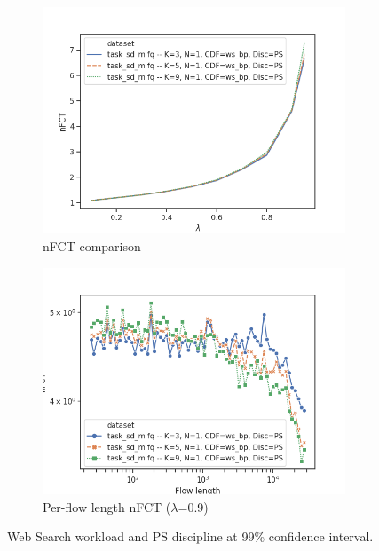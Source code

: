 \begin{figure}
	\centering
	\begin{subfigure}{.5\textwidth}
		\centering
		\includegraphics[width=0.99\textwidth]{Chapter3/Figures/lb_opt_vs_nopt_comparison_fifo}
		\caption{nFCT comparison}
	\end{subfigure}%
	\hfill
	\begin{subfigure}{.5\textwidth}
		\centering
		\includegraphics[width=0.99\textwidth]{Chapter3/Figures/lb_opt_vs_nopt_detailed_ps}
		\caption{Per-flow length nFCT ($\lambda$=0.9)}
		\label{fig:lb-var-K-ps-detailed}
	\end{subfigure}
	\caption{Web Search workload and PS discipline at 99\% confidence interval.}
	\label{fig:lb-var-K-ps}
\end{figure}
